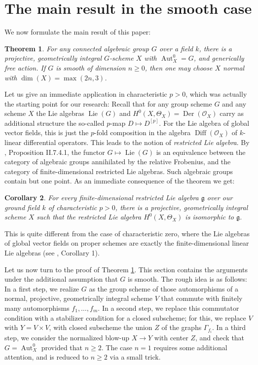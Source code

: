 \documentclass[oneside, 12pt]{amsart}
\newtheorem{theorem}{Theorem}[section]
\newtheorem{corollary}[theorem]{Corollary}
\theoremstyle{definition}
\theoremstyle{remark}
\newcommand{\catO}{\mathcal{O}}
\newcommand{\Aut}{\operatorname{Aut}}
\newcommand{\Der}{\operatorname{Der}}
\newcommand{\Diff}{\operatorname{Diff}}
\newcommand{\Lie}{\operatorname{Lie}}
\newcommand{\ra}{\rightarrow}
\newcommand{\lieg}{\mathfrak{g}}
\begin{document}
\section{The main result  in the  smooth case}
\label{sec:smooth}

We now  formulate  the main result of this paper:


\begin{theorem}
\label{thm:main}
For any connected algebraic group $G$ over a field $k$, there is a projective, 
geometrically integral $G$-scheme $X$ with $\Aut_X^0= G$, and generically free 
action.  If $G$ is smooth of dimension $n\geq 0$, then one may choose  
$X$ normal with $\dim(X)=\max(2n,3)$.
\end{theorem}


Let us give an immediate application in characteristic $p>0$, which was actually the starting point for our research:
Recall that for any group scheme $G$ and any scheme $X$
the Lie algebras $\Lie(G)$ and $H^0(X,\Theta_X) = \Der(\catO_X)$ 
carry as additional structure the so-called $p$-map 
$D\mapsto D^{[p]}$. For the Lie algebra of global vector fields, 
this is just the $p$-fold composition in the  algebra 
$\Diff(\catO_X)$ of $k$-linear differential operators.
This leads to the notion of \emph{restricted Lie algebra}. 
By \cite{Demazure; Gabriel 1970}, Proposition II.7.4.1,  
the functor $G\mapsto \Lie(G)$ is an equivalence 
between the category of algebraic groups annihilated
by the relative Frobenius, and the category of finite-dimensional 
restricted Lie algebras. Such algebraic groups contain but one point. As an immediate
consequence of the theorem we get:

\begin{corollary}
\label{cor:lie algebra}
For every finite-dimensional restricted Lie algebra $\lieg$ over our ground field $k$ of characteristic $p>0$,
there is a  projective,  geometrically integral scheme $X$ such that the restricted Lie algebra $H^0(X,\Theta_X)$
is isomorphic to $\lieg$.
\end{corollary}

This is quite different from the case of characteristic zero,
where the Lie algebras of global vector fields on proper schemes
are exactly the finite-dimensional linear Lie algebras
(see \cite{Brion 2014}, Corollary 1).

Let us now turn to the proof of Theorem \ref{thm:main}.
This section contains the arguments  under the additional assumption 
that $G$ is smooth. The rough idea is as follows:
In a first step, we realize $G$ 
as the group scheme of those automorphisms of 
a normal, projective, geometrically integral 
scheme $V$ that  commute with finitely many 
automorphisms $f_1,\ldots, f_m$.
In a second step, we   replace 
this commutator condition with a stabilizer condition 
for  a closed subscheme;
for this, we replace $V$ with $Y = V \times V$, with
closed subscheme the union $Z$ of the graphs
$\Gamma_{f_i}$. 
In a third step, we consider the normalized blow-up $X\ra Y$ 
with center $Z$, and check that $G= \Aut^0_X$ provided 
that $n \geq 2$. The case $n=1$ requires some additional 
attention, and is reduced to $n\geq 2$  via a small trick. 
\end{document}
